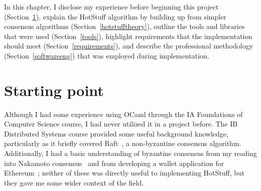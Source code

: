 



In this chapter, I disclose my experience before beginning this project (Section~\ref{start}), explain the HotStuff algorithm by building up from simpler consensus algorithms (Section~\ref{hotstufftheory}), outline the tools and libraries that were used (Section~\ref{tools}), highlight requirements that the implementation should meet (Section~\ref{requirements}), and describe the professional methodology (Section~\ref{softwareeng}) that was employed during implementation.

\section{Starting point} \label{start}
Although I had some experience using OCaml through the IA Foundations of Computer Science course, I had never utilized it in a project before. The IB Distributed Systems course provided some useful background knowledge, particularly as it briefly covered Raft~\cite{ongaroSearchUnderstandableConsensus2014}, a non-byzantine consensus algorithm. Additionally, I had a basic understanding of byzantine consensus from my reading into Nakamoto consensus~\cite{nakamotoBitcoinPeertoPeerElectronic2008} and from developing a wallet application for Ethereum~\cite{ethereumWhite, ethereumYellow}; neither of these was directly useful to implementing HotStuff, but they gave me some wider context of the field.

